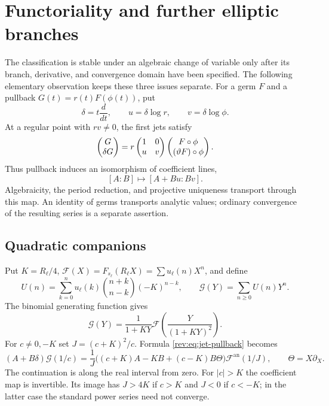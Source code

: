 \section{Functoriality and further elliptic branches}
\label{rev:sec:elliptic-extensions}

The classification is stable under an algebraic change of variable only
after its branch, derivative, and convergence domain have been specified.
The following elementary observation keeps these three issues separate.
For a germ $F$ and a pullback $G(t)=r(t)F(\phi(t))$, put
\[
 \delta=t\frac{d}{dt},\qquad
 u=\delta\log r,\qquad v=\delta\log\phi.
\]
At a regular point with $rv\ne0$, the first jets satisfy
\begin{equation}\label{rev:eq:jet-pullback}
 \begin{pmatrix}G\\ \delta G\end{pmatrix}
 =r\begin{pmatrix}1&0\\u&v\end{pmatrix}
   \begin{pmatrix}F\circ\phi\\(\vartheta F)\circ\phi\end{pmatrix}.
\end{equation}
Thus pullback induces an isomorphism of coefficient lines,
\[
 [A:B]\longmapsto[A+Bu:Bv].
\]
Algebraicity, the period reduction, and projective uniqueness transport
through this map. An identity of germs transports analytic values;
ordinary convergence of the resulting series is a separate assertion.

\subsection{Quadratic companions}\label{sec:quadratic-companion-extra}
Put $K=R_\ell/4$, $\mathcal F(X)=F_{s_\ell}(R_\ell X)
=\sum u_\ell(n)X^n$, and define
\[
 U(n)=\sum_{k=0}^n u_\ell(k)\binom{n+k}{n-k}(-K)^{n-k},
 \qquad \mathcal G(Y)=\sum_{n\ge0}U(n)Y^n.
\]
The binomial generating function gives
\begin{equation}\label{eq:quad-extra-generating}
 \mathcal G(Y)=\frac1{1+KY}
      \mathcal F\!\left(\frac{Y}{(1+KY)^2}\right).
\end{equation}
For $c\ne0,-K$ set $J=(c+K)^2/c$. Formula
\eqref{rev:eq:jet-pullback} becomes
\begin{equation}\label{eq:quad-extra-transport}
 (A+B\delta)\mathcal G(1/c)
 =\frac1J\bigl((c+K)A-KB+(c-K)B\Theta\bigr)
                         \mathcal F^{\mathrm{an}}(1/J),
 \qquad \Theta=X\partial_X.
\end{equation}
The continuation is along the real interval from zero. For $|c|>K$
the coefficient map is invertible. Its image has $J>4K$ if $c>K$
and $J<0$ if $c<-K$; in the latter case the standard power series
need not converge.

